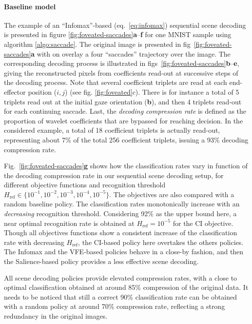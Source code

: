 \documentclass[12pt,twoside,openright]{article}
\begin{document}
\paragraph{Baseline model}
The example of an ``Infomax''-based (eq.~\ref{eq:infomax}) sequential scene decoding is presented in figure \ref{fig:foveated-saccades}\textbf{a}--\textbf{f} for one MNIST sample using algorithm \ref{algo:saccade}.
The original image is presented in fig~\ref{fig:foveated-saccades}\textbf{a} with on overlay a four ``saccades'' trajectory over the image. The corresponding decoding process is illustrated in figs~\ref{fig:foveated-saccades}\textbf{b}--\textbf{e}, giving the reconstructed pixels from  coefficients read-out at successive steps of the decoding process.
Note that several coefficient triplets are read at each end-effector position ($i,j$) (see fig. \ref{fig:foveated}c). There is for instance a total of 5 triplets read out at the initial gaze orientation (\textbf{b}), and then 4 triplets read-out for each continuing saccade. 
Last, the \emph{decoding compression rate} is defined as the proportion of wavelet coefficients that are bypassed for reaching decision. In the considered example, a total of 18 coefficient triplets is  actually read-out, representing about 7\% of the total 256 coefficient triplets, issuing a 93\% decoding compression rate. 

Fig.~\ref{fig:foveated-saccades}\textbf{g} shows how the classification rates vary in function of the decoding compression rate in our sequential scene decoding setup, for different objective functions and recognition threshold $H_\text{ref} \in \{10^{-1}, 10^{-2}, 10^{-3}, 10^{-4}, 10^{-5}\}$. The objectives are also compared with a random baseline policy. The classification rates monotonically increase with an \emph{decreasing} recognition threshold. Considering 92\% as the upper bound here, a near optimal recognition rate is obtained  at $H_\text{ref}=10^{-5}$ for the CI objective. Though all objectives functions show a consistent increase of the classification rate with decreasing $H_\text{ref}$, the CI{\color{Purple}-based policy} here overtakes the others {\color{Purple}policies}. The Infomax and the VFE{\color{Purple}-based policies} behave in a close-by fashion, and then the Salience{\color{Purple}-based policy} {\color{Purple} provides a less effective scene decoding}. 

{\color{Purple} All scene decoding policies provide elevated} compression rates, with a close to optimal classification obtained at around 85\% compression of the original data. It needs to be noticed that still a correct 90\% classification rate can be obtained with a random {\color{Purple} policy} at around 70\% compression rate, reflecting a strong redundancy in the original images.  
\end{document}
